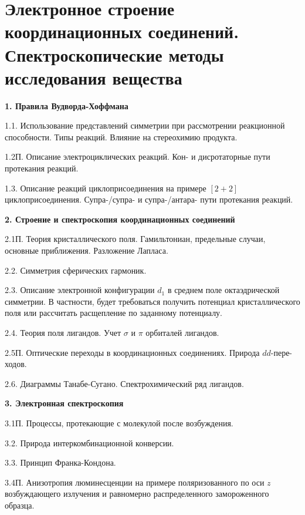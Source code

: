 \section[Электронное строение координационных соединений.\\Спектроскопические методы исследования вещества]{\texorpdfstring{Электронное строение координационных соединений.\\Спектроскопические методы исследования вещества}{Электронное строение координационных соединений. Спектроскопические методы исследования вещества}}
\textbf{1. Правила Вудворда-Хоффмана}\par
1.1. Использование представлений симметрии при рассмотрении реакционной способности. Типы реакций. Влияние на стереохимию продукта.\par
1.2П. Описание электроциклических реакций. Кон- и дисротаторные пути протекания реакций.\par
1.3. Описание реакций циклоприсоединения на примере $[2+2]$ циклоприсоединения. Супра-/супра- и супра-/антара- пути протекания реакций.\par
\textbf{2. Строение и спектроскопия координационных соединений}\par
2.1П. Теория кристаллического поля. Гамильтониан, предельные случаи, основные приближения. Разложение Лапласа.\par
2.2. Симметрия сферических гармоник.\par
2.3. Описание электронной конфигурации $d_1$ в среднем поле октаэдрической симметрии. В частности, будет требоваться получить потенциал кристаллического поля или рассчитать расщепление по заданному потенциалу.\par
2.4. Теория поля лигандов. Учет $\sigma$ и $\pi$ орбиталей лигандов.\par
2.5П. Оптические переходы в координационных соединениях. Природа $dd$-пере-ходов.\par
2.6. Диаграммы Танабе-Сугано. Спектрохимический ряд лигандов.\par
\textbf{3. Электронная спектроскопия}\par
3.1П. Процессы, протекающие с молекулой после возбуждения.\par
3.2. Природа интеркомбинационной конверсии.\par
3.3. Принцип Франка-Кондона.\par
3.4П. Анизотропия люминесценции на примере поляризованного по оси $z$ возбуждающего излучения и равномерно распределенного замороженного образца.\par
